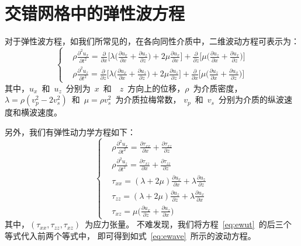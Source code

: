 \documentclass[UTF8]{ctexart}
\renewcommand{\cite}[1]{\textsuperscript{\textsuperscript{\citeleft\citen{#1}\citeright}}}          %
\begin{document}
\section{交错网格中的弹性波方程}
对于弹性波方程，如我们所常见的，在各向同性介质中，二维波动方程可表示为：
\begin{equation}\label{eq:ewave}
\left\{ \begin{aligned}
& \rho \frac{\partial^2 u_x}{\partial t^2}=\frac{\partial}{\partial x}\big[\lambda\big(\frac{\partial u_x}{\partial x}+\frac{\partial u_z}{\partial z}\big)+2\mu\frac{\partial u_x}{\partial x}\big]+\frac{\partial}{\partial z}\big[\mu\big(\frac{\partial u_z}{\partial x}+\frac{\partial u_x}{\partial z}\big)\big] \\
& \rho \frac{\partial^2 u_z}{\partial t^2}=\frac{\partial}{\partial z}\big[\lambda\big(\frac{\partial u_x}{\partial x}+\frac{\partial u_z}{\partial z}\big)+2\mu\frac{\partial u_z}{\partial z}\big]+\frac{\partial}{\partial x}\big[\mu\big(\frac{\partial u_z}{\partial x}+\frac{\partial u_x}{\partial z}\big)\big]
\end{aligned} \right.
\end{equation}
其中，$u_x$~和~$u_z$~分别为~$x$~和~~$z$~方向上的位移，$\rho$~为介质密度，
$\lambda=\rho(v_p^2-2v_s^2)$~和~$\mu=\rho v_s^2$~为介质拉梅常数，
$v_p$~和~$v_s$~分别为介质的纵波速度和横波速度。

另外，我们有弹性动力学方程如下\cite{Virieux_1986}：
\begin{equation}\label{eq:ewut}
\left\{ \begin{aligned}
& \rho \frac{\partial^2 u_x}{\partial t^2}=\frac{\partial \tau_{xx}}{\partial x}+\frac{\partial \tau_{xz}}{\partial z} \\
& \rho \frac{\partial^2 u_z}{\partial t^2}=\frac{\partial \tau_{xz}}{\partial x}+\frac{\partial \tau_{zz}}{\partial z} \\
& \tau_{xx}=(\lambda+2\mu)\frac{\partial u_x}{\partial x}+\lambda\frac{\partial u_z}{\partial z} \\
& \tau_{zz}=(\lambda+2\mu)\frac{\partial u_z}{\partial z}+\lambda\frac{\partial u_x}{\partial x} \\
& \tau_{xz}=\mu\big(\frac{\partial u_x}{\partial z}+\frac{\partial u_z}{\partial x}\big)
\end{aligned} \right.
\end{equation}
其中，$(\tau_{xx},\tau_{zz},\tau_{xz})$~为应力张量。
不难发现，我们将方程~\eqref{eq:ewut}~的后三个等式代入前两个等式中，
即可得到如式~\eqref{eq:ewave}~所示的波动方程。
\end{document}
